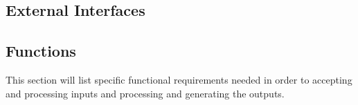 \documentclass[11pt, a4paper,titlepage]{article}
\begin{document}
\subsection{External Interfaces} %


\subsection{Functions} %
This section will list specific functional requirements needed in order to accepting and processing inputs and processing and generating the outputs.
\end{document}
